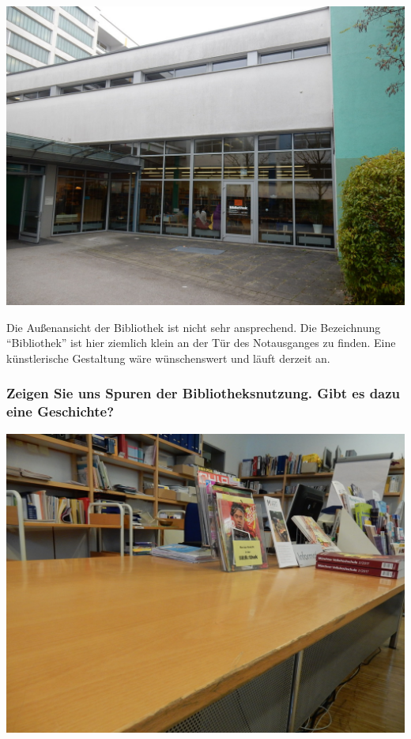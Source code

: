 \begin{center}
\includegraphics{stiftung-pfennigparade/img/aussenansicht.jpg}
\end{center}

Die Außenansicht der Bibliothek ist nicht sehr ansprechend. Die
Bezeichnung \enquote{Bibliothek} ist hier ziemlich klein an der Tür des
Notausganges zu finden. Eine künstlerische Gestaltung wäre wünschenswert
und läuft derzeit an.

\hypertarget{zeigen-sie-uns-spuren-der-bibliotheksnutzung.-gibt-es-dazu-eine-geschichte}{%
\subsubsection*{Zeigen Sie uns Spuren der Bibliotheksnutzung. Gibt es dazu eine
Geschichte?}\label{zeigen-sie-uns-spuren-der-bibliotheksnutzung.-gibt-es-dazu-eine-geschichte}}

\begin{center}
\includegraphics{stiftung-pfennigparade/img/spuren-ausleihtheke.jpg}
\end{center}

